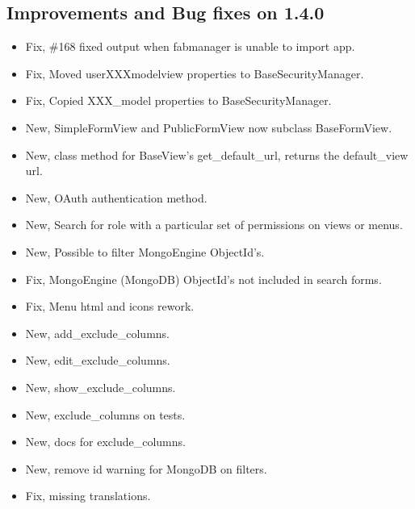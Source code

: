 \documentclass[letterpaper,10pt,english]{sphinxmanual}
\begin{document}
\subsection{Improvements and Bug fixes on 1.4.0}
\label{versions:improvements-and-bug-fixes-on-1-4-0}\begin{itemize}
\item {} 
Fix, \#168 fixed output when fabmanager is unable to import app.

\item {} 
Fix, Moved userXXXmodelview properties to BaseSecurityManager.

\item {} 
Fix, Copied XXX\_model properties to BaseSecurityManager.

\item {} 
New, SimpleFormView and PublicFormView now subclass BaseFormView.

\item {} 
New, class method for BaseView's get\_default\_url, returns the default\_view url.

\item {} 
New, OAuth authentication method.

\item {} 
New, Search for role with a particular set of permissions on views or menus.

\item {} 
New, Possible to filter MongoEngine ObjectId's.

\item {} 
Fix, MongoEngine (MongoDB) ObjectId's not included in search forms.

\item {} 
Fix, Menu html and icons rework.

\item {} 
New, add\_exclude\_columns.

\item {} 
New, edit\_exclude\_columns.

\item {} 
New, show\_exclude\_columns.

\item {} 
New, exclude\_columns on tests.

\item {} 
New, docs for exclude\_columns.

\item {} 
New, remove id warning for MongoDB on filters.

\item {} 
Fix, missing translations.

\end{itemize}
\end{document}
